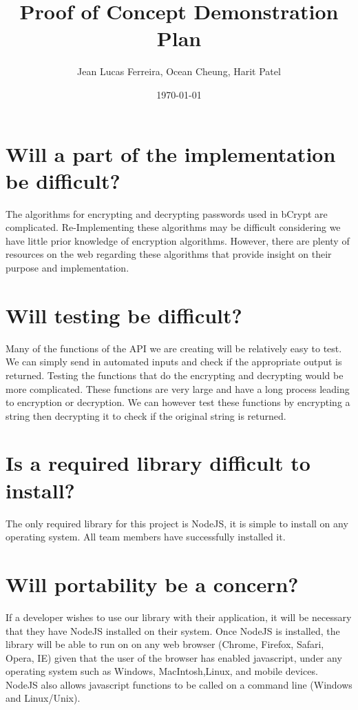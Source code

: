 \documentclass[12pt]{article}
\begin{document}
\title{Proof of Concept Demonstration Plan}

\author{Jean Lucas Ferreira, Ocean Cheung, Harit Patel}

\date{\today}
	
\maketitle

\section*{ Will a part of the implementation be difficult?}

	The algorithms for encrypting and decrypting passwords used in bCrypt are complicated. Re-Implementing these algorithms may be difficult considering we have little prior knowledge of encryption algorithms. However, there are plenty of resources on the web regarding these algorithms that provide insight on their purpose and implementation.


\section*{Will testing be difficult?}

	Many of the functions of the API we are creating will be relatively easy to test. We can simply send in automated inputs and check if the appropriate output is returned. Testing the functions that do the encrypting and decrypting would be more complicated. These functions are very large and have a long process leading to encryption or decryption. We can however test these functions by encrypting a string then decrypting it to check if the original string is returned.

\section*{Is a required library difficult to install?}

	The only required library for this project is NodeJS, it is simple to install on any operating system. All team members have successfully installed it.

\section*{Will portability be a concern?}

	If a developer wishes to use our library with their application, it will be necessary that they have NodeJS installed on their system. Once NodeJS is installed, the library will be able to run on on any web browser (Chrome, Firefox, Safari, Opera, IE) given that the user of the browser has enabled javascript, under any operating system such as Windows, MacIntosh,Linux, and mobile devices. NodeJS also allows javascript functions to be called on a command line (Windows and Linux/Unix).
\end{document}
